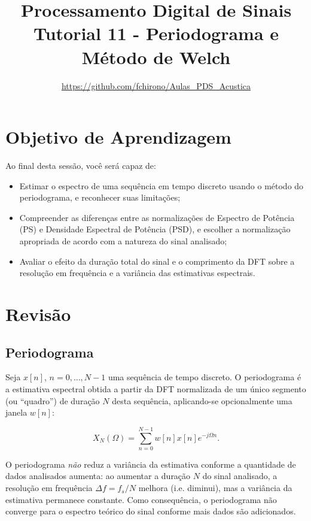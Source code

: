 \documentclass[a4paper,twoside,12pt]{article}
\title{\vspace{-2cm} Processamento Digital de Sinais\\ Tutorial 11 - Periodograma e Método de Welch}
\author{\url{https://github.com/fchirono/Aulas_PDS_Acustica}}
\begin{document}
	\date{}
	\maketitle
	
	\section*{Objetivo de Aprendizagem}
	Ao final desta sessão, você será capaz de:
	\begin{itemize}
		\item Estimar o espectro de uma sequência em tempo discreto usando o método do periodograma, e reconhecer suas limitações;
		\item Compreender as diferenças entre as normalizações de Espectro de Potência (PS) e Densidade Espectral de Potência (PSD), e escolher a normalização apropriada de acordo com a natureza do sinal analisado;
		\item Avaliar o efeito da duração total do sinal e o comprimento da DFT sobre a resolução em frequência e a variância das estimativas espectrais.
	\end{itemize}
	
	\begingroup
	\let\clearpage\relax
	\tableofcontents
	\endgroup
	
	\section{Revisão}
	\subsection{Periodograma}
	
	Seja $x[n]$, $n = 0, \ldots, N-1$ uma sequência de tempo discreto. O periodograma é a estimativa espectral obtida a partir da DFT normalizada de um único segmento (ou ``quadro'') de duração $N$ desta sequência, aplicando-se opcionalmente uma janela $w[n]$:
	
	\begin{equation}
		X_N(\Omega) = \sum_{n=0}^{N-1} w[n] x[n] e^{-j \Omega n}.
	\end{equation}
	
	O periodograma \emph{não} reduz a variância da estimativa conforme a quantidade de dados analisados aumenta: ao aumentar a duração $N$ do sinal analisado, a resolução em frequência $\Delta f = f_s / N$ melhora (i.e. diminui), mas a variância da estimativa permanece constante. Como consequência, o periodograma não converge para o espectro teórico do sinal conforme mais dados são adicionados.
	
\end{document}
